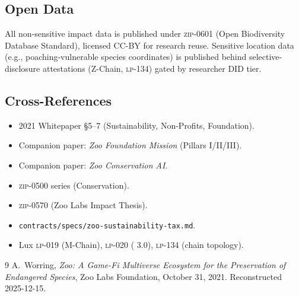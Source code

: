 \subsection{Open Data}

All non-sensitive impact data is published under \textsc{zip-0601}
(Open Biodiversity Database Standard), licensed CC-BY for research
reuse. Sensitive location data (e.g., poaching-vulnerable species
coordinates) is published behind selective-disclosure attestations
(Z-Chain, \textsc{lp-134}) gated by researcher DID tier.

\subsection{Cross-References}

\begin{itemize}[nosep,leftmargin=1.2em]
\item 2021 Whitepaper \S5--7 (Sustainability, Non-Profits, Foundation).
\item Companion paper: \emph{Zoo Foundation Mission} (Pillars I/II/III).
\item Companion paper: \emph{Zoo Conservation AI}.
\item \textsc{zip-0500} series (Conservation).
\item \textsc{zip-0570} (Zoo Labs Impact Thesis).
\item \texttt{contracts/specs/zoo-sustainability-tax.md}.
\item Lux \textsc{lp-019} (M-Chain), \textsc{lp-020} (\Quasar{} 3.0),
  \textsc{lp-134} (chain topology).
\end{itemize}

\begin{thebibliography}{9}
 A.~Worring, \emph{Zoo: A Game-Fi Multiverse Ecosystem
for the Preservation of Endangered Species}, Zoo Labs Foundation,
October 31, 2021. Reconstructed 2025-12-15.
\end{thebibliography}
